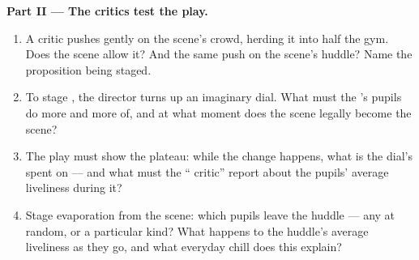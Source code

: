 \begin{problem}
\medskip\noindent\textbf{Part II --- The critics test the play.}
\begin{enumerate}[resume]
  \item A critic pushes gently on the  scene's crowd, herding
        it into half the gym. Does the scene allow it? And the
        same push on the  scene's huddle? Name the
        proposition being staged.
  \item To stage \emph{}, the director turns up an
        imaginary  dial. What must the 's pupils do
        more and more of, and at what moment does the scene
        legally become the  scene?
  \item The play must show the  plateau: while the change
        happens, what is the  dial's  spent on --- and
        what must the `` critic'' report about the
        pupils' average liveliness during it?
  \item Stage evaporation from the  scene: which pupils
        leave the huddle --- any at random, or a particular
        kind? What happens to the huddle's average liveliness as
        they go, and what everyday chill does this explain?
\end{enumerate}


\end{problem}
